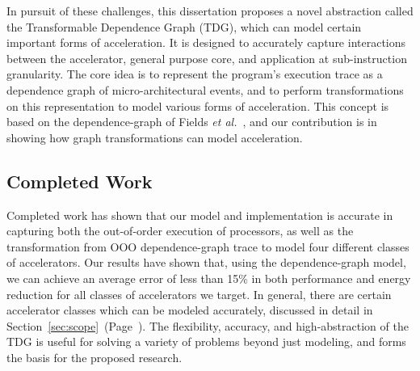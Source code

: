 In pursuit of these challenges, this dissertation proposes 
a novel abstraction called the Transformable
Dependence Graph (TDG), which can model certain important forms of acceleration.  
It is designed to accurately capture interactions between the accelerator, general
purpose core, and application at sub-instruction granularity.   The core idea is to
represent the program’s execution trace as a dependence graph of
micro-architectural events, and to perform transformations on this
representation to model various forms of acceleration.  This concept is based
on the dependence-graph of Fields \emph{et
al.}~\cite{fields:isca01,Fields:2002:SMP:545215.545222}, and our contribution is
in showing how graph transformations can model acceleration.

\subsection{Completed Work}
Completed work has shown that our model and implementation is accurate in
capturing both the out-of-order execution of processors, as well as the
transformation from OOO dependence-graph trace to model four different classes
of accelerators.  Our results have shown that, using the dependence-graph model, we can
achieve an average error of less than 15\% in both performance and energy
reduction for all classes of accelerators we target. In general, there are
certain accelerator classes which can be modeled accurately, discussed in
detail in Section~\ref{sec:scope}~(Page~\pageref{sec:scope}).  
The flexibility, accuracy, and high-abstraction of the TDG is useful for 
solving a variety of problems beyond just modeling, 
and forms the basis for the proposed research.  



